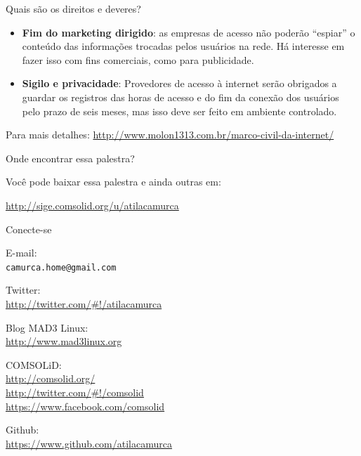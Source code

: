 \begin{frame}{Quais são os direitos e deveres?}

\begin{itemize}
\itemsep1pt\parskip0pt
\item
  \textbf{Fim do marketing dirigido}: as empresas de acesso não poderão
  ``espiar'' o conteúdo das informações trocadas pelos usuários na rede.
  Há interesse em fazer isso com fins comerciais, como para publicidade.
\item
  \textbf{Sigilo e privacidade}: Provedores de acesso à internet serão
  obrigados a guardar os registros das horas de acesso e do fim da
  conexão dos usuários pelo prazo de seis meses, mas isso deve ser feito
  em ambiente controlado.
\end{itemize}

Para mais detalhes:
\url{http://www.molon1313.com.br/marco-civil-da-internet/}

\end{frame}

\begin{frame}{Onde encontrar essa palestra?}

\begin{center}
Você pode baixar essa palestra e ainda outras em:

\bigskip

\large{\url{http://sige.comsolid.org/u/atilacamurca}}
\end{center}

\end{frame}

\begin{frame}


\end{frame}

\begin{frame}{Conecte-se}

\begin{center}
E-mail:\\
\texttt{camurca.home@gmail.com}

\medskip

Twitter:\\
\url{http://twitter.com/\#!/atilacamurca}

\medskip

Blog MAD3 Linux:\\
\url{http://www.mad3linux.org}

\medskip

COMSOLiD:\\
\url{http://comsolid.org/}\\
\url{http://twitter.com/\#!/comsolid}\\
\url{https://www.facebook.com/comsolid}

\medskip

Github:\\
\url{https://www.github.com/atilacamurca}
\end{center}

\end{frame}

